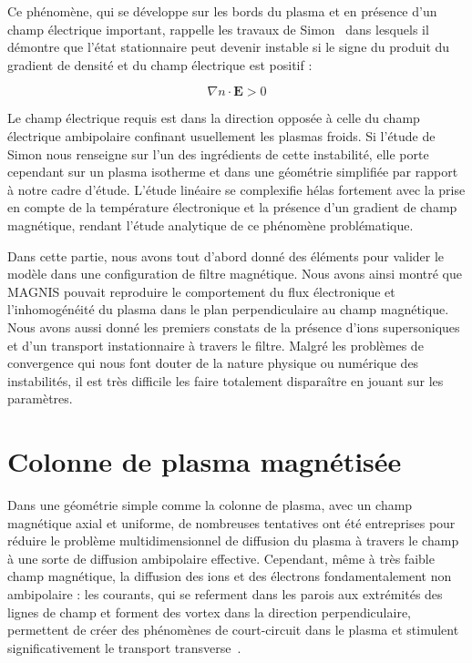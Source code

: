\begin{refsection}
	Ce phénomène, qui se développe sur les bords du plasma et
	en présence d'un champ électrique important, rappelle
	les travaux de Simon~\parencite{Simon63} dans lesquels il démontre que l'état
	stationnaire peut devenir instable si le signe du produit du
	gradient de densité et du champ électrique est positif :
	
	\begin{equation}
		\nabla n\cdot \mathbf E>0
	\end{equation}
	
	Le champ électrique requis est dans la direction opposée à celle du champ
	électrique ambipolaire confinant usuellement les plasmas froids. Si l'étude de
	Simon nous renseigne sur l'un des ingrédients de cette instabilité, elle porte
	cependant sur un plasma isotherme et dans une géométrie simplifiée par rapport
	à notre cadre d'étude. L'étude linéaire se complexifie hélas fortement avec la
	prise en compte de la température électronique et la présence d'un gradient
	de champ magnétique, rendant l'étude analytique de ce phénomène problématique.

	Dans cette partie, nous avons tout d'abord donné des éléments pour
	valider le modèle dans une configuration de filtre magnétique. Nous avons ainsi
	montré que MAGNIS pouvait reproduire le comportement du flux électronique et
	l'inhomogénéité du plasma dans le plan perpendiculaire au champ
	magnétique. Nous avons aussi donné les premiers constats de la présence d'ions
	supersoniques et d'un transport instationnaire à travers le filtre.
	Malgré les problèmes de convergence qui nous font douter de la nature physique
	ou numérique des instabilités, il est très difficile les faire
	totalement disparaître en jouant sur les paramètres.
	
\section{Colonne de plasma magnétisée}
Dans une géométrie simple comme la colonne de plasma, avec un champ magnétique
axial et uniforme, de nombreuses tentatives ont été entreprises pour réduire le
problème multidimensionnel de diffusion du plasma à travers le champ à une
sorte de diffusion ambipolaire effective. Cependant, même à très faible
champ magnétique, la diffusion des ions et des électrons fondamentalement non
ambipolaire : les courants, qui se referment dans les parois aux extrémités des
lignes de champ et forment des vortex dans la direction perpendiculaire,
permettent de créer des phénomènes de court-circuit dans le plasma et stimulent
significativement le transport transverse~\parencite{Gurevich}.


\end{refsection}
